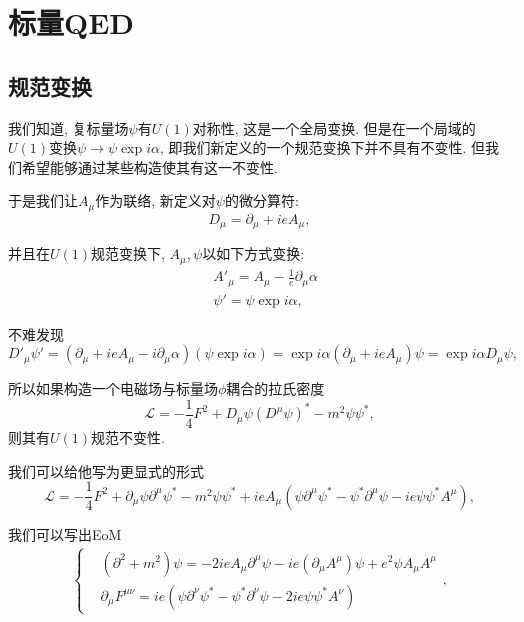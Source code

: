 \newpage
\section{标量QED}
\subsection{规范变换}
我们知道, 复标量场$\psi$有$U(1)$对称性, 这是一个全局变换. 但是在一个局域的$U(1)$变换$\psi\to\psi\exp{i\alpha}$, 即我们新定义的一个规范变换下并不具有不变性. 但我们希望能够通过某些构造使其有这一不变性.

于是我们让$A_\mu$作为联络, 新定义对$\psi$的微分算符:
\begin{equation}
    D_\mu=\partial_\mu+ieA_\mu,
\end{equation}

并且在$U(1)$规范变换下, $A_\mu, \psi$以如下方式变换:
\begin{align}
    &A'_\mu=A_\mu-\frac1e\partial_\mu\alpha\\
    &\psi'=\psi\exp{i\alpha},
\end{align}

不难发现
\begin{equation}
    D'_\mu\psi'=(\partial_\mu+ieA_\mu-i\partial_\mu\alpha)(\psi\exp{i\alpha})=\exp{i\alpha}(\partial_\mu+ieA_\mu)\psi=\exp{i\alpha}D_\mu\psi,
\end{equation}

所以如果构造一个电磁场与标量场$\phi$耦合的拉氏密度
\begin{equation}
    \mathcal L=-\frac14 F^2+D_\mu\psi(D^\mu\psi)^*-m^2\psi\psi^*,
\end{equation}
则其有$U(1)$规范不变性.

我们可以给他写为更显式的形式
\begin{equation}
    \mathcal L=-\frac14F^2+\partial_\mu\psi\partial^\mu\psi^*-m^2\psi\psi^*+ieA_\mu(\psi\partial^\mu\psi^*-\psi^*\partial^\mu\psi-ie\psi\psi^*A^\mu),
\end{equation}

我们可以写出EoM
\begin{align}
    \begin{cases}
        &(\partial^2+m^2)\psi=-2ieA_\mu\partial^\mu\psi-ie(\partial_\mu A^\mu)\psi+e^2\psi A_\mu A^\mu\\
        &\partial_\mu F^{\mu\nu}=ie(\psi\partial^\nu\psi^*-\psi^*\partial^\nu\psi-2ie\psi\psi^*A^\nu)
    \end{cases},
\end{align}

